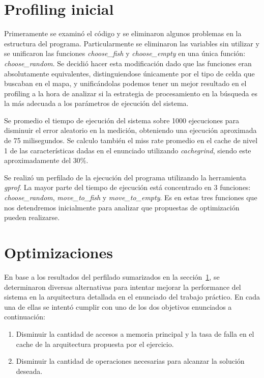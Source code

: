 \documentclass[a4paper,11pt]{article}
\begin{document}
\section{Profiling inicial} \label{sec:profinicial}

Primeramente se examinó el código y se eliminaron algunos problemas en la
estructura del programa. Particularmente se eliminaron las variables sin
utilizar y se unificaron las funciones \textit{choose\_fish} y
\textit{choose\_empty} en una única función: \textit{choose\_random}. Se
decidió hacer esta modificación dado que las funciones eran absolutamente
equivalentes, distinguiendose únicamente por el tipo de celda que buscaban en
el mapa, y unificándolas podemos tener un mejor resultado en el profiling a la
hora de analizar si la estrategia de procesamiento en la búsqueda es la más
adecuada a los parámetros de ejecución del sistema.

Se promedio el tiempo de ejecución del sistema sobre 1000 ejecuciones para
disminuir el error aleatorio en la medición, obteniendo una ejecución
aproximada de 75 milisegundos. Se calculo también el miss rate promedio en el
cache de nivel 1 de las características dadas en el enunciado utilizando
\textit{cachegrind}, siendo este aproximadamente del 30\%.

Se realizó un perfilado de la ejecución del programa utilizando la herramienta
\textit{gprof}. La mayor parte del tiempo de ejecución está concentrado en 3
funciones: \textit{choose\_random}, \textit{move\_to\_fish} y
\textit{move\_to\_empty}. Es en estas tres funciones que nos detendremos
inicialmente para analizar que propuestas de optimización pueden realizarse.

\section{Optimizaciones}

En base a los resultados del perfilado sumarizados en la
sección~\ref{sec:profinicial}, se determinaron diversas alternativas para
intentar mejorar la performance del sistema en la arquitectura detallada en el
enunciado del trabajo práctico. En cada una de ellas se intentó cumplir con uno
de los dos objetivos enunciados a continuación:

\begin{enumerate}

  \item Disminuir la cantidad de accesos a memoria principal y la tasa de falla
      en el cache de la arquitectura propuesta por el ejercicio.

  \item Disminuir la cantidad de operaciones necesarias para alcanzar la
      solución deseada.

\end{enumerate}
\end{document}
